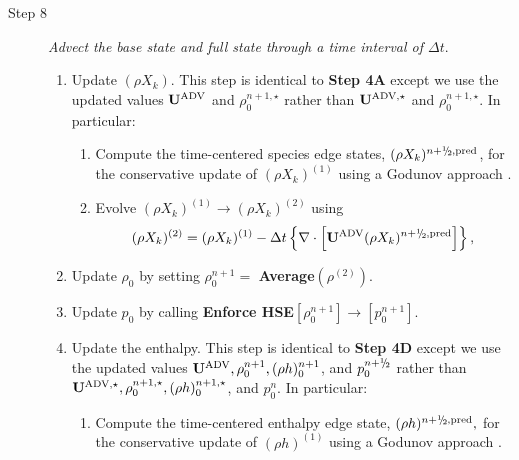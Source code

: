 \documentclass{aastex62}
\newcommand{\sfrac}[2]{\mathchoice
  {\kern0em\raise.5ex\hbox{\the\scriptfont0 #1}\kern-.15em/
   \kern-.15em\lower.25ex\hbox{\the\scriptfont0 #2}}
  {\kern0em\raise.5ex\hbox{\the\scriptfont0 #1}\kern-.15em/
   \kern-.15em\lower.25ex\hbox{\the\scriptfont0 #2}}
  {\kern0em\raise.5ex\hbox{\the\scriptscriptfont0 #1}\kern-.2em/
   \kern-.15em\lower.25ex\hbox{\the\scriptscriptfont0 #2}}
  {#1\!/#2}}
\newcommand{\myhalf}{\sfrac{1}{2}}
\newcommand{\Ub}{{\bf{U}}}
\newcommand{\dt}{\Delta t}
\newcommand{\pred}{{\rm pred}}
\newcommand{\nph}{{n+\myhalf}}
\newcommand{\uadvone}{\Ub^{\mathrm{ADV},\star}}
\newcommand{\uadvtwo}{\Ub^{\mathrm{ADV}}}
\begin{document}
\begin{description}
\item[Step 8] {\em Advect the base state and full state through a time interval of $\dt.$}

\begin{enumerate}
\renewcommand{\theenumi}{{\bf \Alph{enumi}}}

\item Update $(\rho X_k)$.  This step is identical to {\bf Step 4A} except we use
  the updated values $\uadvtwo$ and $\rho_0^{n+1,\star}$ rather than
  $\uadvone$ and $\rho_0^{n+1,\star}$.  In particular:

\begin{enumerate}
\renewcommand{\labelenumii}{{\bf \roman{enumii}}.}

\item Compute the time-centered species edge states, $(\rho X_k)^{\nph,\pred}$,
  for the conservative update of $(\rho X_k)^{(1)}$ using a Godunov approach \citep{XRB_III}.

\item Evolve $(\rho X_k)^{(1)} \rightarrow (\rho X_k)^{(2)}$ using
\begin{equation}
(\rho X_k)^{(2)} = (\rho X_k)^{(1)}
- \dt \left\{ \nabla \cdot \left[\uadvtwo (\rho X_k)^{\nph,\pred} \right] \right\},
\end{equation}

\end{enumerate}

\item Update $\rho_0$ by setting $\rho_0^{n+1} =$ {\bf Average}$(\rho^{(2)})$.

\item Update $p_0$ by calling
{\bf Enforce HSE}$[\rho_0^{n+1}] \rightarrow [p_0^{n+1}]$.

\item Update the enthalpy.  This step is identical to {\bf Step 4D} except we use
  the updated values $\uadvtwo, \rho_0^{n+1}, (\rho h)_0^{n+1}$, and $p_0^{n+\myhalf}$
  rather than
  $\uadvone, \rho_0^{n+1,\star}, (\rho h)_0^{n+1,\star}$, and $p_0^n$.
  In particular:

\begin{enumerate}
\renewcommand{\labelenumii}{{\bf \roman{enumii}}.}

\item Compute the time-centered enthalpy edge state, $(\rho h)^{\nph,\pred},$
  for the conservative update of $(\rho h)^{(1)}$ using a Godunov approach \citep{XRB_III}.


\end{enumerate}
\end{enumerate}
\end{description}
\end{document}

